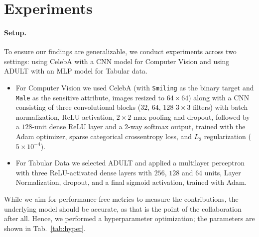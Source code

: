 \documentclass[sigconf]{acmart}
\begin{document}
\section{Experiments}
\label{sec:exp}

\paragraph{Setup. }

To ensure our findings are generalizable, we conduct experiments across two settings: using CelebA with a CNN model for Computer Vision and using ADULT with an MLP model for Tabular data. 

\begin{itemize}
	\item For Computer Vision we used CelebA (with \texttt{Smiling} as the binary target and \texttt{Male} as the sensitive attribute, images resized to $64\times64$) along with a CNN consisting of three convolutional blocks ($32$, $64$, $128$ $3\times3$ filters) with batch normalization, ReLU activation, $2\times2$ max-pooling and dropout, followed by a $128$-unit dense ReLU layer and a $2$-way softmax output, trained with the Adam optimizer, sparse categorical crossentropy loss, and $L_2$ regularization ($5\times10^{-4}$).
	\item For Tabular Data we selected ADULT and applied a multilayer perceptron with three ReLU-activated dense layers with $256$, $128$ and $64$ units, Layer Normalization, dropout, and a final sigmoid activation, trained with Adam.
\end{itemize}

While we aim for performance-free metrics to measure the contributions, the underlying model should be accurate, as that is the point of the collaboration after all. Hence, we performed a hyperparameter optimization; the parameters are shown in Tab.~\ref{tab:hyper}.
\end{document}
